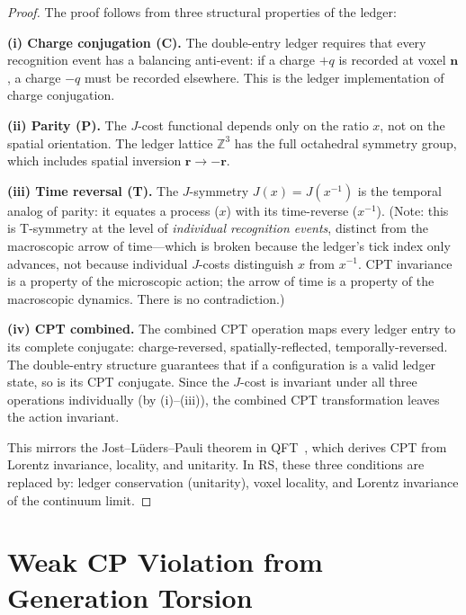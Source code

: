 \documentclass[12pt,a4paper]{article}
\theoremstyle{definition}
\theoremstyle{remark}
\begin{document}
\begin{proof}
The proof follows from three structural properties of the ledger:

\textbf{(i) Charge conjugation (C).}
The double-entry ledger requires that every recognition event
has a balancing anti-event: if a charge $+q$ is recorded at
voxel $\mathbf{n}$, a charge $-q$ must be recorded elsewhere.
This is the ledger implementation of charge conjugation.

\textbf{(ii) Parity (P).}
The $J$-cost functional depends only on the ratio $x$, not on
the spatial orientation.  The ledger lattice $\mathbb{Z}^3$ has
the full octahedral symmetry group, which includes spatial
inversion $\mathbf{r} \to -\mathbf{r}$.

\textbf{(iii) Time reversal (T).}
The $J$-symmetry $J(x) = J(x^{-1})$ is the temporal analog of
parity: it equates a process ($x$) with its time-reverse
($x^{-1}$).  (Note: this is T-symmetry at the level of
\emph{individual recognition events}, distinct from the
macroscopic arrow of time---which is broken because the ledger's
tick index only advances, not because individual $J$-costs
distinguish $x$ from $x^{-1}$.  CPT invariance is a property
of the microscopic action; the arrow of time is a property of
the macroscopic dynamics.  There is no contradiction.)

\textbf{(iv) CPT combined.}
The combined CPT operation maps every ledger entry to its
complete conjugate: charge-reversed, spatially-reflected,
temporally-reversed.  The double-entry structure guarantees
that if a configuration is a valid ledger state, so is its
CPT conjugate.  Since the $J$-cost is invariant under all
three operations individually (by (i)--(iii)), the combined CPT
transformation leaves the action invariant.

This mirrors the Jost--L\"uders--Pauli theorem in
QFT~\cite{Streater1964}, which derives CPT from Lorentz
invariance, locality, and unitarity.  In RS, these three
conditions are replaced by: ledger conservation (unitarity),
voxel locality, and Lorentz invariance of the continuum limit.
\end{proof}

\section{Weak CP Violation from Generation Torsion}
\label{sec:weak-cp}
\end{document}
